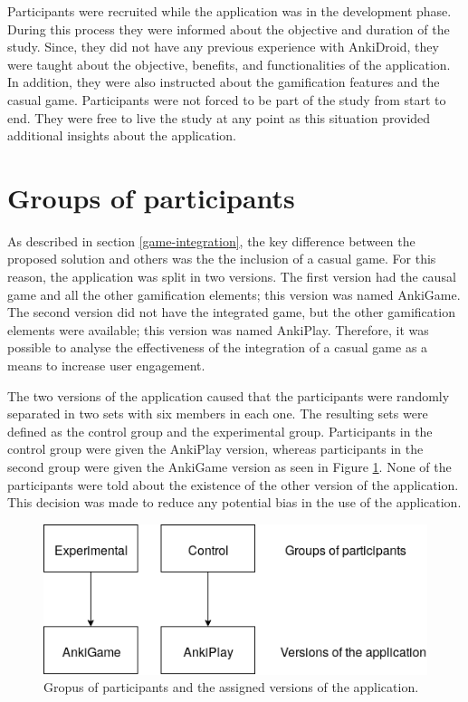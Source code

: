 Participants were recruited while the application was in the development phase. During this process they were informed about the objective and duration of the study. Since, they did not have any previous experience with AnkiDroid, they were taught about the objective, benefits, and functionalities of the application. In addition, they were also instructed about the gamification features and the casual game. Participants were not forced to be part of the study from start to end. They were free to live the study at any point as this situation provided additional insights about the application.

\section{Groups of participants}
As described in section \ref{game-integration}, the key difference between the proposed solution and others was the the inclusion of a casual game. For this reason, the application was split in two versions. The first version had the causal game and all the other gamification elements; this version was named AnkiGame. The second version did not have the integrated game, but the other gamification elements were available; this version was named AnkiPlay. Therefore, it was possible to analyse the effectiveness of the integration of a casual game as a means to increase user engagement.

The two versions of the application caused that the participants were randomly separated in two sets with six members in each one. The resulting sets were defined as the control group and the experimental group. Participants in the control group were given the AnkiPlay version, whereas participants in the second group were given the AnkiGame version as seen in Figure \ref{fig:participants-version}. None of the participants were told about the existence of the other version of the application. This decision was made to reduce any potential bias in the use of the application.

\begin{figure}[htb]
    \vskip 5mm
        \begin{center}
            \includegraphics[scale=0.7]{./Figures/participants_version.png}
            \caption{Gropus of participants and the assigned versions of the application.}
            \label{fig:participants-version}
        \end{center}
    \vskip -5mm
\end{figure}

